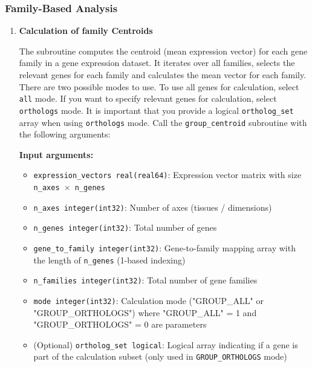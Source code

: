 \subsubsection{Family-Based Analysis}
\begin{enumerate}
    \item \textbf{Calculation of family Centroids}
          
          The subroutine computes the centroid (mean expression vector) for each
          gene family in a gene expression dataset. It iterates over all
          families, selects the relevant genes for each family and calculates the
          mean vector for each family. There are two possible modes to use. To use
          all genes for calculation, select \texttt{all} mode. If you want to
          specify relevant genes for calculation, select \texttt{orthologs} mode.
          It is important that you provide a logical \texttt{ortholog\_set}
          array when using \texttt{orthologs} mode. Call the \texttt{group\_centroid}
          subroutine with the following arguments:
          
          \textbf{Input arguments:}
          \begin{itemize}
            \item \texttt{expression\_vectors real(real64)}: Expression vector matrix
                  with size \texttt{n\_axes $\times$ n\_genes}
                  
            \item \texttt{n\_axes integer(int32)}: Number of axes (tissues /
                  dimensions)
                  
            \item \texttt{n\_genes integer(int32)}: Total number of genes
                  
            \item \texttt{gene\_to\_family integer(int32)}: Gene-to-family mapping
                  array with the length of \texttt{n\_genes} (1-based indexing)
                  
            \item \texttt{n\_families integer(int32)}: Total number of gene families
                  
            \item \texttt{mode integer(int32)}: Calculation mode ("GROUP\_ALL" or "GROUP\_ORTHOLOGS") where "GROUP\_ALL" = 1 and "GROUP\_ORTHOLOGS" = 0 are parameters
                  
            \item (Optional) \texttt{ortholog\_set logical}: Logical array indicating
                  if a gene is part of the calculation subset (only used in \texttt{GROUP\_ORTHOLOGS}
                  mode)
          \end{itemize}
                  

\end{enumerate}
